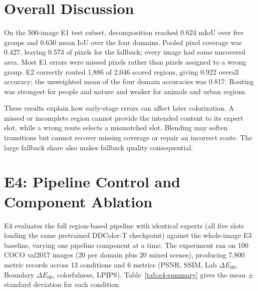 \documentclass{FastFyp}
\begin{document}
\section{Overall Discussion}
\label{sec:overall-discussion}

On the 500-image E1 test subset, decomposition reached 0.624 mIoU over five
groups and 0.630 mean IoU over the four domains. Pooled pixel coverage was
0.427, leaving 0.573 of pixels for the fallback; every image had some
uncovered area. Most E1 errors were missed pixels rather than pixels assigned
to a wrong group. E2 correctly routed 1,886 of 2,046 scored regions, giving
0.922 overall accuracy; the unweighted mean of the four domain accuracies was
0.817. Routing was strongest for people and nature and weaker for animals and
urban regions.

These results explain how early-stage errors can affect later colorization.
A missed or incomplete region cannot provide the intended content to its
expert slot, while a wrong route selects a mismatched slot. Blending may
soften transitions but cannot recover missing coverage or repair an incorrect
route. The large fallback share also makes fallback quality consequential.

\section{E4: Pipeline Control and Component Ablation}
\label{sec:e4-ablation}

E4 evaluates the full region-based pipeline with identical experts (all five
slots loading the same pretrained DDColor-T checkpoint) against the whole-image
E3 baseline, varying one pipeline component at a time. The experiment ran on
100 COCO val2017 images (20 per domain plus 20 mixed scenes), producing 7,800
metric records across 13 conditions and 6 metrics (PSNR, SSIM, Lab $\Delta
E_{00}$, Boundary $\Delta E_{00}$, colorfulness, LPIPS). Table~\ref{tab:e4-summary}
gives the mean $\pm$ standard deviation for each condition.
\end{document}
